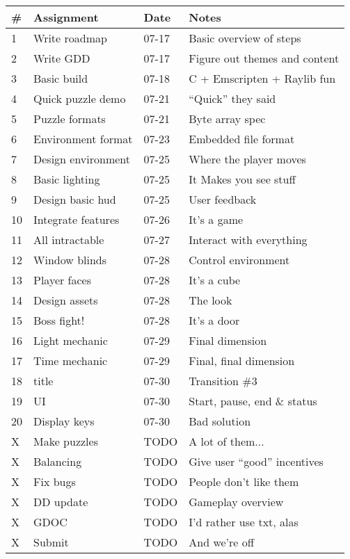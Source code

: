 \documentclass[12pt, letterpaper]{article}
\begin{document}
\bgroup
\def\arraystretch{1.5}
\begin{tabular}{ R{0.4cm} p{4cm} p{1.5cm} p{5.5cm} }
\toprule
{} & \textbf{Assignment} & \textbf{Date} & \textbf{Notes} \\ 
 & Write roadmap & 07-17 & Basic overview of steps \\
2 & Write GDD & 07-17 & Figure out themes and content \\
3 & Basic build & 07-18 & C + Emscripten + Raylib fun \\
4 & Quick puzzle demo & 07-21 & ``Quick'' they said \\
5 & Puzzle formats & 07-21 & Byte array spec \\
6 & Environment format & 07-23 & Embedded file format \\
7 & Design environment & 07-25 & Where the player moves \\
8 & Basic lighting & 07-25 & It Makes you see stuff \\
9 & Design basic hud & 07-25 & User feedback \\
10 & Integrate features & 07-26 & It's a game \\
11 & All intractable & 07-27 & Interact with everything \\
12 & Window blinds & 07-28 & Control environment \\
13 & Player faces & 07-28 & It's a cube \\
14 & Design assets & 07-28 & The look \\
15 & Boss fight! & 07-28 & It's a door \\

16 & Light mechanic & 07-29 & Final dimension \\
17 & Time mechanic & 07-29 & Final, final dimension \\
18 & title & 07-30 & Transition \#3 \\
19 & UI & 07-30 & Start, pause, end \& status \\
20 & Display keys & 07-30 & Bad solution \\

X & Make puzzles & TODO & A lot of them... \\
X & Balancing & TODO & Give user ``good'' incentives \\
X & Fix bugs & TODO & People don't like them \\

X & DD update & TODO & Gameplay overview \\
X & GDOC & TODO & I'd rather use txt, alas \\
X & Submit & TODO & And we're off \\



\bottomrule
\end{tabular}
\egroup

\end{document}
